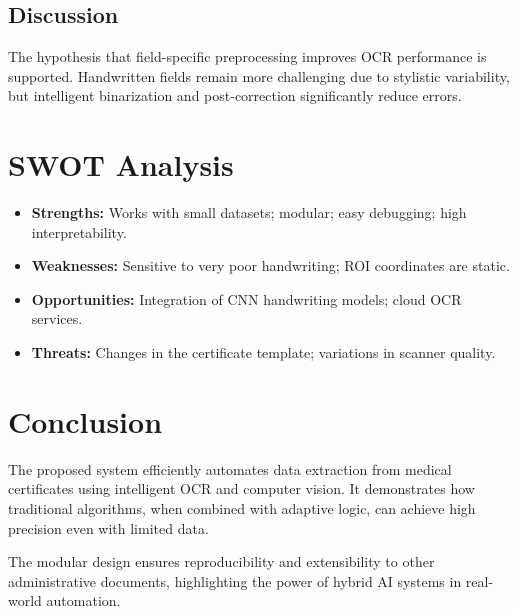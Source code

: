 \documentclass[runningheads,a4paper,11pt]{report}
\begin{document}
\section{Discussion}
The hypothesis that field-specific preprocessing improves OCR performance is supported. Handwritten fields remain more challenging due to stylistic variability, but intelligent binarization and post-correction significantly reduce errors.

\chapter{SWOT Analysis}
\label{chapter:swot}
\begin{itemize}
\item \textbf{Strengths:} Works with small datasets; modular; easy debugging; high interpretability.
\item \textbf{Weaknesses:} Sensitive to very poor handwriting; ROI coordinates are static.
\item \textbf{Opportunities:} Integration of CNN handwriting models; cloud OCR services.
\item \textbf{Threats:} Changes in the certificate template; variations in scanner quality.
\end{itemize}

\chapter{Conclusion}
\label{chapter:concl}

The proposed system efficiently automates data extraction from medical certificates using intelligent OCR and computer vision. It demonstrates how traditional algorithms, when combined with adaptive logic, can achieve high precision even with limited data.

The modular design ensures reproducibility and extensibility to other administrative documents, highlighting the power of hybrid AI systems in real-world automation.

\nocite{*}


\end{document}
